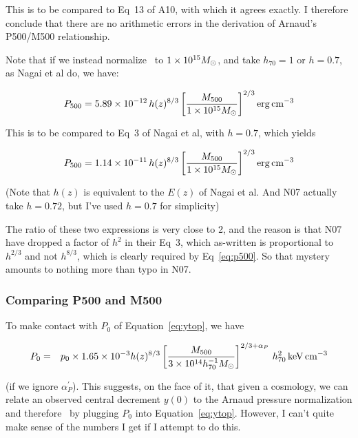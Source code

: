 This is to be compared to Eq~13 of A10, with which it agrees exactly.
I therefore conclude that there are no arithmetic errors in the
derivation of Arnaud's P500/M500 relationship.

Note that if we instead normalize \ to
$1\times10^{15}M_{\odot}$, and take $h_{70} = 1$ or $h = 0.7$, as Nagai et al do, we
have:

\begin{equation}
\P500 = 5.89\times10^{-12} \, h(z)^{8/3}\left[{{\M500}\over{1\times10^{15}\Msolar}}\right]^{2/3} {\rm erg\,cm^{-3}}
\end{equation}

This is to be compared to Eq~3 of Nagai et al, with $h = 0.7$, which yields

\begin{equation}
\P500 = 1.14\times10^{-11} \, h(z)^{8/3}\left[{{\M500}\over{1\times10^{15}\Msolar}}\right]^{2/3} {\rm erg\,cm^{-3}}
\end{equation}

(Note that $h(z)$ is equivalent to the $E(z)$ of Nagai et al.  And N07
actually take $h = 0.72$, but I've used $h = 0.7$ for simplicity) 

The ratio of these two expressions is very close to 2, and the reason
is that N07 have dropped a factor of $h^2$ in their Eq~3, which
as-written is proportional to $h^{2/3}$ and not $h^{8/3}$, which is
clearly required by Eq~\ref{eq:p500}.  So that mystery amounts to
nothing more than typo in N07.

\subsubsection{Comparing P500 and M500}
\label{sec:confusion}

To make contact with $P_0$ of Equation~\ref{eq:ytop}, we have

\begin{eqnarray}
P_0 &=& p_0\times1.65\times10^{-3}h(z)^{8/3}\left[{\M500\over{3\times10^{14}h^{-1}_{70}\Msolar}}\right]^{2/3+\alpha_P}\,h^2_{70}\,{\rm keV\,cm^{-3}}
\label{eq:arnaudnorm}
\end{eqnarray}

(if we ignore $\alpha^\prime_P$).  This suggests, on the face of it,
that given a cosmology, we can relate an observed central decrement $y(0)$ to the Arnaud pressure normalization and therefore \, by plugging $P_0$ into Equation~\ref{eq:ytop}.  However, I can't quite make sense of the numbers I get if I attempt to do this.  

